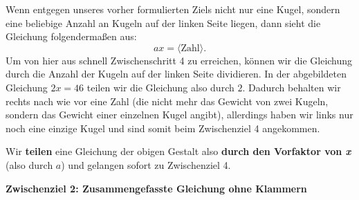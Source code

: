 \documentclass[../../main.tex]{subfiles}
\begin{document}

Wenn entgegen unseres vorher formulierten Ziels nicht nur eine Kugel, sondern eine beliebige Anzahl an Kugeln auf der linken Seite liegen, dann sieht die Gleichung folgendermaßen aus:
\[ax=\langle \text{Zahl} \rangle.\]
Um von hier aus schnell Zwischenschritt 4 zu erreichen, können wir die Gleichung durch die Anzahl der Kugeln auf der linken Seite dividieren. In der abgebildeten Gleichung $2x=46$ teilen wir die Gleichung also durch $2$. Dadurch behalten wir rechts nach wie vor eine Zahl (die nicht mehr das Gewicht von zwei Kugeln, sondern das Gewicht einer einzelnen Kugel angibt), allerdings haben wir links nur noch eine einzige Kugel und sind somit beim Zwischenziel 4 angekommen.

Wir \textbf{teilen} eine Gleichung der obigen Gestalt also \textbf{durch den Vorfaktor von \emph{x}} (also durch $a$) und gelangen sofort zu Zwischenziel 4.

\newpage
\textbf{Zwischenziel 2: Zusammengefasste Gleichung ohne Klammern}

\end{document}
